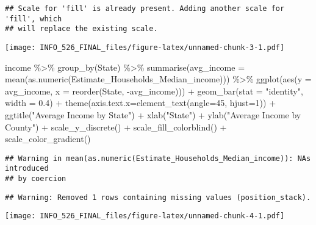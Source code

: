 \documentclass[
]{article}
\newenvironment{Shaded}{\begin{snugshade}}{\end{snugshade}}
\newcommand{\AttributeTok}[1]{\textcolor[rgb]{0.77,0.63,0.00}{#1}}
\newcommand{\DecValTok}[1]{\textcolor[rgb]{0.00,0.00,0.81}{#1}}
\newcommand{\FloatTok}[1]{\textcolor[rgb]{0.00,0.00,0.81}{#1}}
\newcommand{\FunctionTok}[1]{\textcolor[rgb]{0.00,0.00,0.00}{#1}}
\newcommand{\NormalTok}[1]{#1}
\newcommand{\SpecialCharTok}[1]{\textcolor[rgb]{0.00,0.00,0.00}{#1}}
\newcommand{\StringTok}[1]{\textcolor[rgb]{0.31,0.60,0.02}{#1}}
\begin{document}
\begin{verbatim}
## Scale for 'fill' is already present. Adding another scale for 'fill', which
## will replace the existing scale.
\end{verbatim}

\texttt{[image: INFO\_526\_FINAL\_files/figure-latex/unnamed-chunk-3-1.pdf]}

\begin{Shaded}
\begin{Highlighting}[]
\NormalTok{income }\SpecialCharTok{\%\textgreater{}\%}
  \FunctionTok{group\_by}\NormalTok{(State) }\SpecialCharTok{\%\textgreater{}\%}
  \FunctionTok{summarise}\NormalTok{(}\AttributeTok{avg\_income =} \FunctionTok{mean}\NormalTok{(}\FunctionTok{as.numeric}\NormalTok{(Estimate\_Households\_Median\_income))) }\SpecialCharTok{\%\textgreater{}\%}
  \FunctionTok{ggplot}\NormalTok{(}\FunctionTok{aes}\NormalTok{(}\AttributeTok{y =}\NormalTok{ avg\_income,}
             \AttributeTok{x =} \FunctionTok{reorder}\NormalTok{(State, }\SpecialCharTok{{-}}\NormalTok{avg\_income))) }\SpecialCharTok{+} 
  \FunctionTok{geom\_bar}\NormalTok{(}\AttributeTok{stat =} \StringTok{"identity"}\NormalTok{, }\AttributeTok{width =} \FloatTok{0.4}\NormalTok{) }\SpecialCharTok{+}
  \FunctionTok{theme}\NormalTok{(}\AttributeTok{axis.text.x=}\FunctionTok{element\_text}\NormalTok{(}\AttributeTok{angle=}\DecValTok{45}\NormalTok{, }\AttributeTok{hjust=}\DecValTok{1}\NormalTok{)) }\SpecialCharTok{+}
  \FunctionTok{ggtitle}\NormalTok{(}\StringTok{"Average Income by State"}\NormalTok{) }\SpecialCharTok{+}
  \FunctionTok{xlab}\NormalTok{(}\StringTok{"State"}\NormalTok{) }\SpecialCharTok{+}
  \FunctionTok{ylab}\NormalTok{(}\StringTok{"Average Income by County"}\NormalTok{) }\SpecialCharTok{+}
  \FunctionTok{scale\_y\_discrete}\NormalTok{() }\SpecialCharTok{+}
  \FunctionTok{scale\_fill\_colorblind}\NormalTok{() }\SpecialCharTok{+} 
  \FunctionTok{scale\_color\_gradient}\NormalTok{()}
\end{Highlighting}
\end{Shaded}

\begin{verbatim}
## Warning in mean(as.numeric(Estimate_Households_Median_income)): NAs introduced
## by coercion
\end{verbatim}

\begin{verbatim}
## Warning: Removed 1 rows containing missing values (position_stack).
\end{verbatim}

\texttt{[image: INFO\_526\_FINAL\_files/figure-latex/unnamed-chunk-4-1.pdf]}
\end{document}
